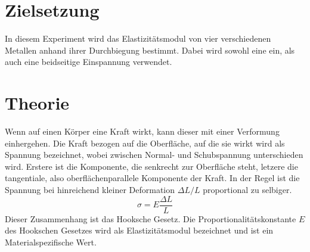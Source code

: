 \section{Zielsetzung}
In diesem Experiment wird das Elastizitätsmodul von vier verschiedenen Metallen anhand ihrer Durchbiegung bestimmt. Dabei wird sowohl eine ein, als auch 
eine beidseitige Einspannung verwendet.
\section{Theorie}
Wenn auf einen Körper eine Kraft wirkt, kann dieser mit einer Verformung einhergehen. Die Kraft bezogen auf die Oberfläche, auf die sie wirkt wird als Spannung bezeichnet, wobei 
zwischen Normal- und Schubspannung unterschieden wird. Erstere ist die Komponente, die senkrecht zur Oberfläche steht, letzere die tangentiale, 
also oberflächenparallele Komponente der Kraft. In der Regel ist die Spannung bei hinreichend kleiner Deformation $\Delta L/L$ proportional zu selbiger.
\begin{equation}
\sigma=E\frac{\Delta L}{L}
\end{equation}
Dieser Zusammenhang ist das Hooksche Gesetz. Die Proportionalitätskonstante $E$ des Hookschen Gesetzes wird als Elastizitätsmodul bezeichnet und ist ein 
Materialspezifische Wert. \\
